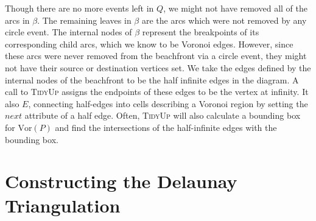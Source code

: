 \documentclass[12pt,twoside]{reedthesis}
\begin{document}
    Though there are no more events left in $Q$, we might not have removed all of the arcs in $\beta$. The remaining leaves in $\beta$ are the arcs which were not removed by any circle event. The internal nodes of $\beta$ represent the breakpoints of its corresponding child arcs, which we know to be Voronoi edges. However, since these arcs were never removed from the beachfront via a circle event, they might not have their source or destination vertices set. We take the edges defined by the internal nodes of the beachfront to be the half infinite edges in the diagram. A call to \textsc{TidyUp} assigns the endpoints of these edges to be the vertex at infinity. It also  $E$, connecting half-edges into cells describing a Voronoi region by setting the $next$ attribute of a half edge. Often, \textsc{TidyUp} will also calculate a bounding box for $\mbox{Vor}(P)$ and find the intersections of the half-infinite edges with the bounding box. 


  \clearpage

  \chapter*{Constructing the Delaunay Triangulation}
    \setcounter{chapter}{3}
    \setcounter{section}{0}
\end{document}
